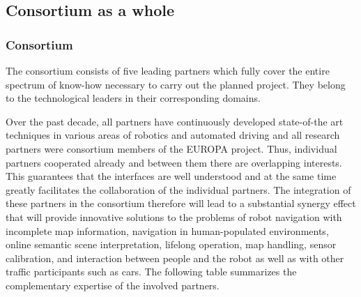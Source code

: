 
\clearpage
\subsection{Consortium as a whole}
\label{sec:consortium}




\subsubsection{Consortium}

The \Project{} consortium consists of five leading partners which fully cover the entire spectrum of know-how necessary to carry out the planned project.  They belong to the technological leaders in their corresponding domains.

Over the past decade, all partners have continuously developed state-of-the art techniques in various areas of robotics and automated driving and all research partners were consortium members of the EUROPA project. Thus, individual partners cooperated already and between them there are overlapping interests. This guarantees that the
interfaces are well understood and at the same time greatly facilitates the collaboration of the individual partners. The integration of these partners in the \Project{} consortium therefore will lead to a substantial synergy effect that will provide innovative solutions to the problems of robot navigation with incomplete map information, navigation in human-populated environments, online semantic scene interpretation, lifelong operation, map handling, sensor calibration, and interaction between people and the robot as well as with other traffic participants such as cars. The following table summarizes the complementary expertise of the involved partners.

